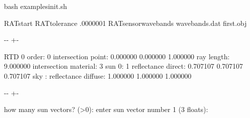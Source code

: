 \documentclass[letterpaper,10pt,english]{sphinxmanual}
\newlength\nbsphinxcodecellspacing
\begin{document}
{
\begin{sphinxVerbatim}[commandchars=\\\{\}]
\llap{\color{nbsphinxin}[21]:\,\hspace{\fboxrule}\hspace{\fboxsep}}\PYGZpc{}\PYGZpc{}bash
 examples\PYGZus{}init.sh

RATstart \PYGZhy{}RATtolerance .0000001 \PYGZhy{}RATsensor\PYGZus{}wavebands wavebands.dat first.obj 
\end{sphinxVerbatim}
}

{

\kern-\sphinxverbatimsmallskipamount\kern-\baselineskip
\kern+\FrameHeightAdjust\kern-\fboxrule
\vspace{\nbsphinxcodecellspacing}

\begin{sphinxVerbatim}[commandchars=\\\{\}]
RTD 0
order: 0        intersection point:     0.000000 0.000000 1.000000
                ray length:             9.000000
                intersection material:  3
                sun 0:                  1 reflectance
                direct:                 0.707107 0.707107 0.707107
                sky  :                  reflectance
                diffuse:                1.000000 1.000000 1.000000
\end{sphinxVerbatim}
}

{

\kern-\sphinxverbatimsmallskipamount\kern-\baselineskip
\kern+\FrameHeightAdjust\kern-\fboxrule
\vspace{\nbsphinxcodecellspacing}

\begin{sphinxVerbatim}[commandchars=\\\{\}]
how many sun vectors? (>0): enter sun vector number 1 (3 floats):
\end{sphinxVerbatim}
}
\end{document}
